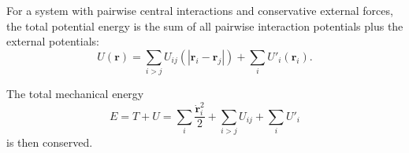 For a system with pairwise central interactions and conservative external forces, the total potential energy is the sum of all pairwise interaction potentials plus the external potentials:
$$U(\mathbf{r}) = \sum_{i > j} U_{ij}(|\mathbf{r}_i - \mathbf{r}_j|) + \sum_{i} U'_i(\mathbf{r}_i).$$

The total mechanical energy
$$E = T + U = \sum_i \frac{\dot{\mathbf{r}}_i^2}{2} + \sum_{i > j} U_{ij} + \sum_i U'_i$$
is then conserved.
